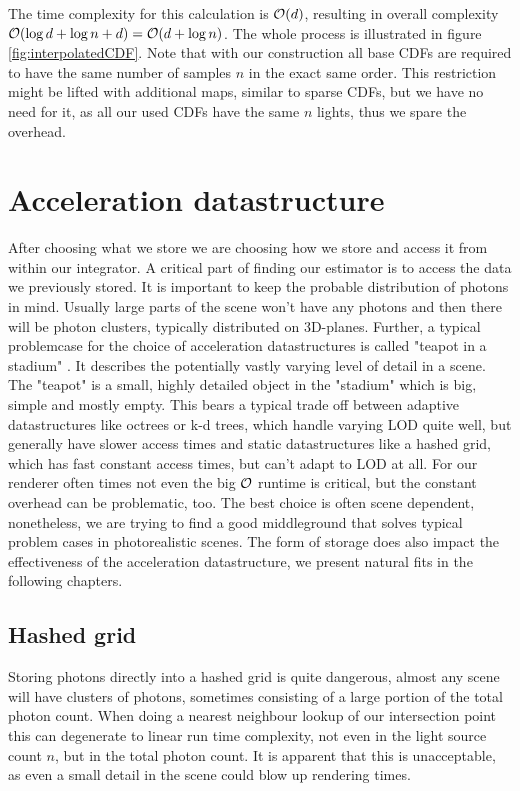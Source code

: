 The time complexity for this calculation is $\mathcal{O}(d)$, resulting in overall complexity $\mathcal{O}(\log{d} + \log{n} + d) = \mathcal{O}(d + \log{n})$. The whole process is illustrated in figure \ref{fig:interpolatedCDF}. Note that with our construction all base CDFs are required to have the same number of samples $n$ in the exact same order. This restriction might be lifted with additional maps, similar to sparse CDFs, but we have no need for it, as all our used CDFs have the same $n$ lights, thus we spare the overhead.

\section{Acceleration datastructure}
\label{ch:AccelDat}

After choosing what we store we are choosing how we store and access it from within our integrator. A critical part of finding our estimator is to access the data we previously stored. It is important to keep the probable distribution of photons in mind. Usually large parts of the scene won't have any photons and then there will be photon clusters, typically distributed on 3D-planes. Further, a typical problemcase for the choice of acceleration datastructures is called "teapot in a stadium" . It describes the potentially vastly varying level of detail in a scene. The "teapot" is a small, highly detailed object in the "stadium" which is big, simple and mostly empty. This bears a typical trade off between adaptive datastructures like octrees or k-d trees, which handle varying LOD quite well, but generally have slower access times and static datastructures like a hashed grid, which has fast constant access times, but can't adapt to LOD at all. For our renderer often times not even the big $\mathcal{O}$ runtime is critical, but the constant overhead can be problematic, too. The best choice is often scene dependent, nonetheless, we are trying to find a good middleground that solves typical problem cases in photorealistic scenes. The form of storage does also impact the effectiveness of the acceleration datastructure, we present natural fits in the following chapters.

\subsection{Hashed grid}
\label{ch:pnee:hashedgrid}
Storing photons directly into a hashed grid is quite dangerous, almost any scene will have clusters of photons, sometimes consisting of a large portion of the total photon count. When doing a nearest neighbour lookup of our intersection point this can degenerate to linear run time complexity, not even in the light source count $n$, but in the total photon count. It is apparent that this is unacceptable, as even a small detail in the scene could blow up rendering times.

